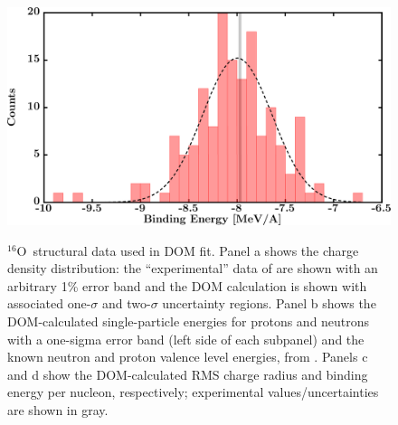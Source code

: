 \documentclass[twocolumn,secnumarabic,amssymb, nobibnotes, aps, prl,
superscriptaddress, nobalancelastpage]{revtex4}
\newcommand{\oSix}{\ensuremath{^{16}}O}
\begin{document}
\begin{figure}
\begin{minipage}{0.45\textwidth}
        \label{DOM_o16_RMSRadius}
    \end{minipage}
    \begin{minipage}{0.45\textwidth}
        \centering
        \includegraphics[width=\textwidth]{figures/o16_BE.png}
        \label{DOM_o16_BE}
    \end{minipage}
    \caption{\oSix\ structural data used in DOM fit. Panel a shows the charge
        density distribution: the ``experimental'' data of \cite{DeVries1987}
        are shown with an arbitrary 1\% error band and the DOM calculation is
        shown with associated one-$\sigma$ and two-$\sigma$ uncertainty regions.
        Panel b shows the DOM-calculated single-particle energies for protons
        and neutrons with a one-sigma error band (left side of each subpanel) and
        the known neutron and proton valence level energies, from \cite{AME2016}.
        Panels c and d show the DOM-calculated RMS charge radius and binding energy per
    nucleon, respectively; experimental values/uncertainties are shown in gray.}
    \label{DOM_o16_structural}
\end{figure}
\end{document}

